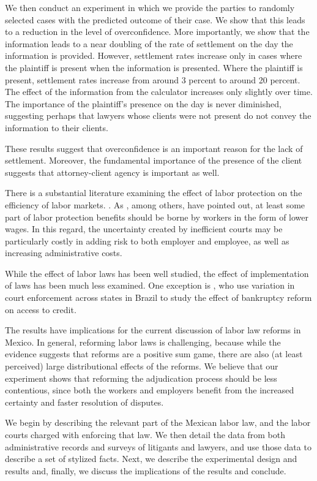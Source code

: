 \documentclass[11pt]{article}
\begin{document}
We then conduct an experiment in which we provide the parties to randomly selected cases with the predicted outcome of their case. We show that this leads to a reduction in the level of overconfidence. More importantly, we show that the information leads to a near doubling of the rate of settlement on the day the information is provided. However, settlement rates increase only in cases where the plaintiff is present when the information is presented. Where the plaintiff is present, settlement rates increase from around 3 percent to around 20 percent. The effect of the information from the calculator increases only slightly over time. The importance of the plaintiff’s presence on the day is never diminished, suggesting perhaps that lawyers whose clients were not present do not convey the information to their clients. 

These results suggest that overconfidence is an important reason for the lack of settlement. Moreover, the fundamental importance of the presence of the client suggests that attorney-client agency is important as well. 

There is a substantial literature examining the effect of labor protection on the efficiency of labor markets. \cite{BesleyBurgess_EconomicPerformance}. As \cite{AlmeidaCarnero_EnforcementLaborRegulation}, among others, have pointed out, at least some part of labor protection benefits should be borne by workers in the form of lower wages. In this regard, the uncertainty created by inefficient courts may be particularly costly in adding risk to both employer and employee, as well as increasing administrative costs.

While the effect of labor laws has been well studied, the effect of implementation of laws has been much less examined. One exception is \cite{PonticelliAlencar_Bankrupcy}, who use variation in court enforcement across states in Brazil to study the effect of bankruptcy reform on access to credit. 

The results have implications for the current discussion of labor law reforms in Mexico. In general, reforming labor laws is challenging, because while the evidence suggests that reforms are a positive sum game, there are also (at least perceived) large distributional effects of the reforms. We believe that our experiment shows that reforming the adjudication process should be less contentious, since both the workers and employers benefit from the increased certainty and faster resolution of disputes.

We begin by describing the relevant part of the Mexican labor law, and the labor courts charged with enforcing that law. We then detail the data from both administrative records and surveys of litigants and lawyers, and use those data to describe a set of stylized facts. Next, we describe the experimental design and results and, finally, we discuss the implications of the results and conclude. 
 
\end{document}
